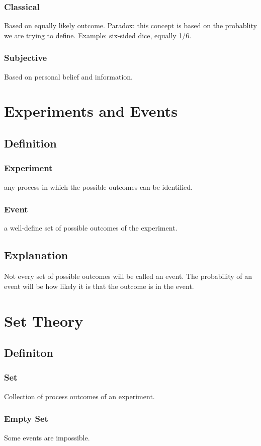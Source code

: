 \documentclass{book}
\begin{document}
			\subsubsection{Classical}
			Based on equally likely outcome.  Paradox: this concept is based on the 
			probablity we are trying to define.  Example: six-sided dice, equally 1/6.

			\subsubsection{Subjective}
			Based on personal belief and information.  

	\section{Experiments and Events}
		\subsection{Definition}
			\subsubsection{Experiment}
			any process in which the possible outcomes can be identified.  
			\subsubsection{Event}
			a well-define set of possible outcomes of the experiment.  

		\subsection{Explanation}
		Not every set of possible outcomes will be called an event.  The probability 
		of an event will be how likely it is that the outcome is in the event.  

	\section{Set Theory}
		\subsection{Definiton}
			\subsubsection{Set}
			Collection of process outcomes of an experiment.  
			\subsubsection{Empty Set}
			Some events are impossible.  
		
\end{document}
